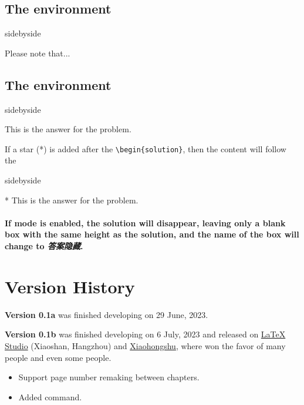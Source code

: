 \subsection{The  environment}
\begin{tcblisting}{sidebyside}
\begin{note}
    Please note that...
\end{note}
\end{tcblisting}

\subsection{The  environment}
\begin{tcblisting}{sidebyside}
\begin{solution}
    This is the answer for the problem.
\end{solution}
\end{tcblisting}

If a star (*) is added after the \verb|\begin{solution}|, then the content will follow the 
\begin{tcblisting}{sidebyside}
\begin{solution}*
    This is the answer for the problem.
\end{solution}
\end{tcblisting}

\paragraph{If mode  is enabled, the solution will disappear, leaving only a blank box with the same height as the solution, and the name of the box will change to \emph{\textcolor{1号色}{\textbf{ 答案隐藏}}}.}

\section{Version History}

\textsf{\bfseries Version 0.1a} was finished developing on 29 June, 2023. 

\textsf{\bfseries Version 0.1b} was finished developing on 6 July, 2023 and released on \href{https://www.latexstudio.net/index/details/index/mid/3553.html}{LaTeX Studio} (Xiaoshan, Hangzhou) and \href{http://xhslink.com/YBuuuw}{Xiaohongshu}, where won the favor of many people and even some people.

\begin{itemize}
    \item Support page number remaking between chapters.
    \item Added  command.
\end{itemize}

